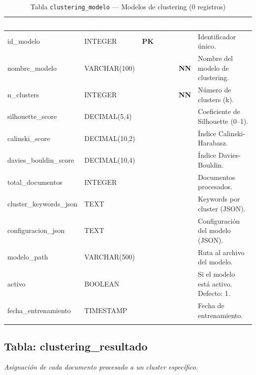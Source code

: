 \documentclass[11pt,a4paper]{article}
\newcommand{\tableheadrow}{\rowcolor{tableheader}}
\newcommand{\tablehead}[1]{\textcolor{white}{\textbf{#1}}}
\newcommand{\pk}{\textcolor{emiblue}{\textbf{PK}}}
\newcommand{\nn}{\textcolor{red!70!black}{\textbf{NN}}}
\begin{document}
\begin{longtable}{p{4.2cm} p{2.8cm} c c c p{4.5cm}}
\toprule
\tableheadrow
\tablehead{Campo} & \tablehead{Tipo} & \tablehead{PK} & \tablehead{FK} & \tablehead{NN} & \tablehead{Descripción} \\
\midrule
\endhead
id\_modelo & INTEGER & \pk & & & Identificador único. \\
\rowcolor{tablerow}
nombre\_modelo & VARCHAR(100) & & & \nn & Nombre del modelo de clustering. \\
n\_clusters & INTEGER & & & \nn & Número de clusters (k). \\
\rowcolor{tablerow}
silhouette\_score & DECIMAL(5,4) & & & & Coeficiente de Silhouette (0--1). \\
calinski\_score & DECIMAL(10,2) & & & & Índice Calinski-Harabasz. \\
\rowcolor{tablerow}
davies\_bouldin\_score & DECIMAL(10,4) & & & & Índice Davies-Bouldin. \\
total\_documentos & INTEGER & & & & Documentos procesados. \\
\rowcolor{tablerow}
cluster\_keywords\_json & TEXT & & & & Keywords por cluster (JSON). \\
configuracion\_json & TEXT & & & & Configuración del modelo (JSON). \\
\rowcolor{tablerow}
modelo\_path & VARCHAR(500) & & & & Ruta al archivo del modelo. \\
activo & BOOLEAN & & & & Si el modelo está activo. Defecto: 1. \\
\rowcolor{tablerow}
fecha\_entrenamiento & TIMESTAMP & & & & Fecha de entrenamiento. \\
\bottomrule
\caption{Tabla \texttt{clustering\_modelo} — Modelos de clustering (0 registros)}
\end{longtable}

\subsection{Tabla: clustering\_resultado}
\textit{Asignación de cada documento procesado a un cluster específico.}
\end{document}
